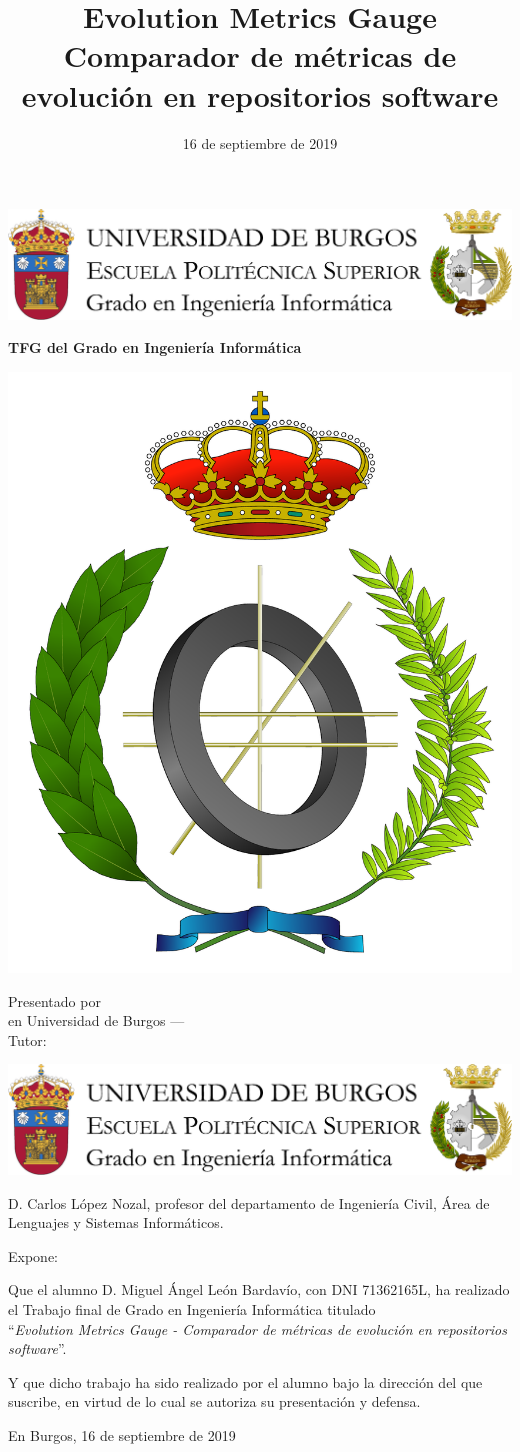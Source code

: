 \documentclass[a4paper,12pt,twoside]{memoir}
\title{{\Huge Evolution Metrics Gauge}\\[0.5cm]Comparador de métricas de evolución en repositorios software}
\author{\nombre}
\date{16 de septiembre de 2019}
\makeatletter
\def\maketitle{
  \null
  \thispagestyle{empty}
\noindent\includegraphics[width=\textwidth]{cabecera}\vspace{1cm}%
  \vfill
  \colorbox{cpardoBox}{%
    \begin{minipage}{.8\textwidth}
      \vspace{.5cm}\Large
      \begin{center}
      \textbf{TFG del Grado en Ingeniería Informática}\vspace{.6cm}\\
      \textbf{\LARGE\@title{}}
      \end{center}
      \vspace{.2cm}
    \end{minipage}

  }%
  \hfill\begin{minipage}{.20\textwidth}
    \includegraphics[width=\textwidth]{escudoInfor}
  \end{minipage}
  \vfill
  \begin{center}%
  {%
    \noindent\Large
    Presentado por \@author{}\\ 
	en Universidad de Burgos ---  \@date{}\\
    Tutor: \@tutor{}\\
  }%
  \end{center}%
  \null
  \cleardoublepage
  }
\newcommand{\nombre}{Miguel Ángel León Bardavío} %
\makeatother
\begin{document}
\maketitle


\newpage\null\thispagestyle{empty}\newpage


\thispagestyle{empty}


\noindent\includegraphics[width=\textwidth]{cabecera}\vspace{1cm}

\noindent D. Carlos López Nozal, profesor del departamento de Ingeniería Civil, Área de Lenguajes y Sistemas Informáticos.

\noindent Expone:

\noindent Que el alumno D. \nombre, con DNI 71362165L, ha realizado el Trabajo final de Grado en Ingeniería Informática titulado\\ ``\textit{Evolution Metrics Gauge - Comparador de métricas de evolución en repositorios software}''. 

\noindent Y que dicho trabajo ha sido realizado por el alumno bajo la dirección del que suscribe, en virtud de lo cual se autoriza su presentación y defensa.

\begin{center} %
En Burgos, {\large 16 de septiembre de 2019}
\end{center}

\vfill\vfill\vfill

%
\end{document}
